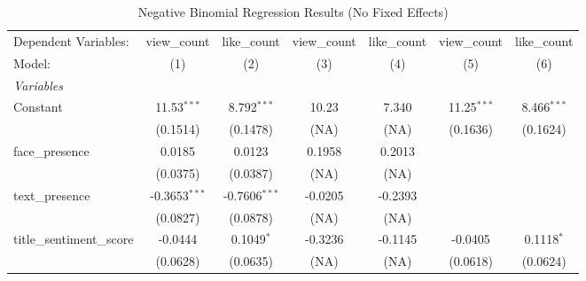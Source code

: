 
\begin{table}[htbp]
   \caption{Negative Binomial Regression Results (No Fixed Effects)}
   \centering
   \begin{tabular}{lcccccc}
      \tabularnewline \midrule \midrule
      Dependent Variables:           & view\_count                    & like\_count                   & view\_count            & like\_count          & view\_count                    & like\_count\\   
      Model:                         & (1)                            & (2)                           & (3)                    & (4)                  & (5)                            & (6)\\  
      \midrule
      \emph{Variables}\\
      Constant                       & 11.53$^{***}$                  & 8.792$^{***}$                 & 10.23                  & 7.340                & 11.25$^{***}$                  & 8.466$^{***}$\\   
                                     & (0.1514)                       & (0.1478)                      & (NA)                   & (NA)                 & (0.1636)                       & (0.1624)\\   
      face\_presence                 & 0.0185                         & 0.0123                        & 0.1958                 & 0.2013               &                                &   \\   
                                     & (0.0375)                       & (0.0387)                      & (NA)                   & (NA)                 &                                &   \\   
      text\_presence                 & -0.3653$^{***}$                & -0.7606$^{***}$               & -0.0205                & -0.2393              &                                &   \\   
                                     & (0.0827)                       & (0.0878)                      & (NA)                   & (NA)                 &                                &   \\   
      title\_sentiment\_score        & -0.0444                        & 0.1049$^{*}$                  & -0.3236                & -0.1145              & -0.0405                        & 0.1118$^{*}$\\   
                                     & (0.0628)                       & (0.0635)                      & (NA)                   & (NA)                 & (0.0618)                       & (0.0624)\\   

\end{tabular}
\end{table}
